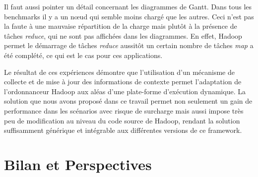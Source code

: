 
Il faut aussi pointer un détail concernant les diagrammes de Gantt. Dans tous les benchmarks il y a un n{\oe}ud qui semble moins chargé que les autres. Ceci n'est pas la faute à une mauvaise répartition de la charge mais plutôt à la présence de tâches \textit{reduce}, qui ne sont pas affichées dans les diagrammes. En effet, Hadoop permet le démarrage de tâches \textit{reduce} aussitôt un certain nombre de tâches \textit{map} a été complété, ce qui est le cas pour ces applications.

Le résultat de ces expériences démontre que l'utilisation d'un mécanisme de collecte et de mise à jour des informations de contexte permet l'adaptation de l'ordonnanceur Hadoop aux aléas d'une plate-forme d'exécution dynamique. La solution que nous avons proposé dans ce travail permet non seulement un gain de performance dans les scénarios avec risque de surcharge mais aussi impose très peu de modification au niveau du code source de Hadoop, rendant la solution suffisamment générique et intégrable aux différentes versions de ce framework. 


\section{Bilan et Perspectives} \label{sec:disc}








